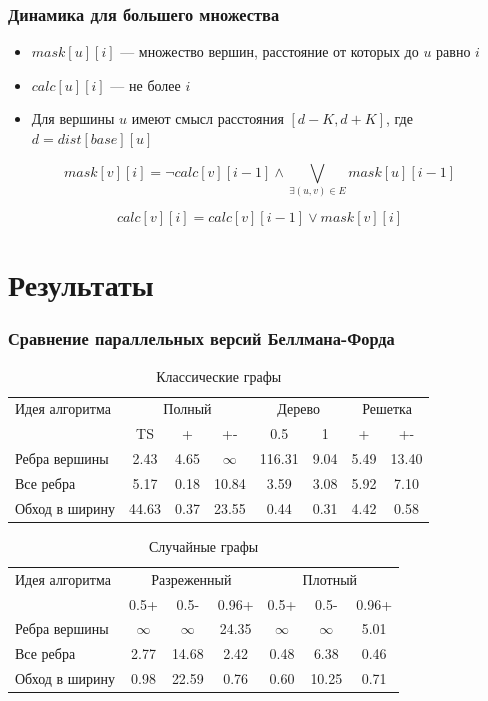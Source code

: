 \documentclass[10pt, compress]{beamer}
\begin{document}
\begin{frame}[fragile]
  \frametitle{Динамика для большего множества}
    \begin{itemize}
		\item $mask[u][i]$ --- множество вершин, расстояние от которых до $u$ равно $i$ 
		\item $calc[u][i]$ --- не более $i$
		\item Для вершины $u$ имеют смысл расстояния $[d - K, d + K]$, где $d = dist[base][u]$
	\end{itemize}
	
	\begin{equation}
mask[v][i] = \neg calc[v][i - 1] \wedge \bigvee_{\exists (u, v) \in E} mask[u][i - 1] 
\end{equation}

\begin{equation}
calc[v][i] = calc[v][i - 1] \vee mask[v][i]
\end{equation}

\end{frame}

\section{Результаты}
\begin{frame}[fragile]
  \frametitle{Сравнение параллельных версий Беллмана-Форда}
\begin{table}
\centering
\begin{tabular}{l|ccc|cc|cc}  
Идея алгоритма& \multicolumn{3}{c}{Полный} & \multicolumn{2}{c}{Дерево} & \multicolumn{2}{c}{Решетка} \\
& TS & + & +- & 0.5 & 1 & + & +- \\
\hline\hline
Ребра вершины & 2.43 & 4.65 & $\infty$ & 116.31 & 9.04 & 5.49 & 13.40\\  
Все ребра & 5.17 & 0.18 & 10.84 & 3.59 & 3.08 & 5.92 & 7.10  \\
Обход в ширину & 44.63 & 0.37 & 23.55 & 0.44 & 0.31 & 4.42 & 0.58 \\
\end{tabular}
\caption{Классические графы}
\label{graph_description}
\end{table}


\begin{table}
\centering
\begin{tabular}{l|ccc|ccc}  
Идея алгоритма& \multicolumn{3}{c}{Разреженный} & \multicolumn{3}{c}{Плотный}\\
& 0.5+  & 0.5- & 0.96+ & 0.5+ & 0.5- & 0.96+\\
\hline\hline
Ребра вершины & $\infty$ & $\infty$ & 24.35 & $\infty$ & $\infty$ & 5.01 \\  
Все ребра & 2.77 & 14.68 & 2.42 & 0.48  & 6.38  & 0.46 \\
Обход в ширину & 0.98 & 22.59 & 0.76  & 0.60  & 10.25 & 0.71 \\
\end{tabular}
\caption{Случайные графы}
\label{graph_description}
\end{table}

\end{frame}
\end{document}

